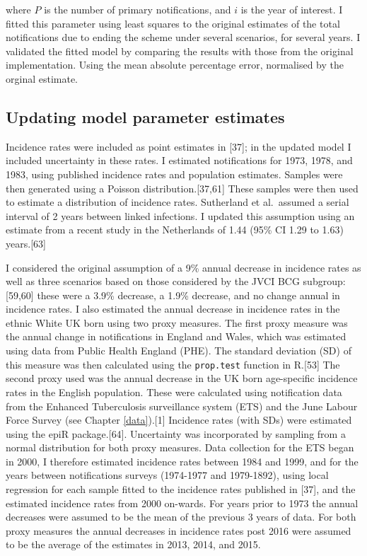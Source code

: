 \documentclass[11pt,twoside]{bristolthesis}
\begin{document}
  where \(P\) is the number of primary notifications, and \(i\) is the year of interest. I fitted this parameter using least squares to the original estimates of the total notifications due to ending the scheme under several scenarios, for several years. I validated the fitted model by comparing the results with those from the original implementation. Using the mean absolute percentage error, normalised by the orginal estimate.
  
  \hypertarget{updating-model-parameter-estimates}{%
  \subsection{Updating model parameter estimates}\label{updating-model-parameter-estimates}}
  
  Incidence rates were included as point estimates in {[}37{]}; in the updated model I included uncertainty in these rates. I estimated notifications for 1973, 1978, and 1983, using published incidence rates and population estimates. Samples were then generated using a Poisson distribution.{[}37,61{]} These samples were then used to estimate a distribution of incidence rates. Sutherland et al.~assumed a serial interval of 2 years between linked infections. I updated this assumption using an estimate from a recent study in the Netherlands of 1.44 (95\% CI 1.29 to 1.63) years.{[}63{]}
  
  I considered the original assumption of a 9\% annual decrease in incidence rates as well as three scenarios based on those considered by the JVCI BCG subgroup:{[}59,60{]} these were a 3.9\% decrease, a 1.9\% decrease, and no change annual in incidence rates. I also estimated the annual decrease in incidence rates in the ethnic White UK born using two proxy measures. The first proxy measure was the annual change in notifications in England and Wales, which was estimated using data from Public Health England (PHE). The standard deviation (SD) of this measure was then calculated using the \texttt{prop.test} function in R.{[}53{]} The second proxy used was the annual decrease in the UK born age-specific incidence rates in the English population. These were calculated using notification data from the Enhanced Tuberculosis surveillance system (ETS) and the June Labour Force Survey (see Chapter \ref{data}).{[}1{]} Incidence rates (with SDs) were estimated using the epiR package.{[}64{]}. Uncertainty was incorporated by sampling from a normal distribution for both proxy measures. Data collection for the ETS began in 2000, I therefore estimated incidence rates between 1984 and 1999, and for the years between notifications surveys (1974-1977 and 1979-1892), using local regression for each sample fitted to the incidence rates published in {[}37{]}, and the estimated incidence rates from 2000 on-wards. For years prior to 1973 the annual decreases were assumed to be the mean of the previous 3 years of data. For both proxy measures the annual decreases in incidence rates post 2016 were assumed to be the average of the estimates in 2013, 2014, and 2015.
  
\end{document}
